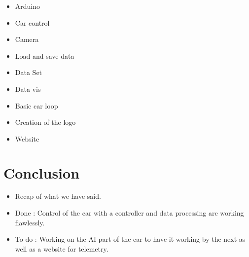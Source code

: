\documentclass[11pt]{article}
\begin{document}
\begin{itemize}

\item Arduino %
\item Car control %
\item Camera %
\item Load and save data %
\item Data Set %
\item Data vis %
\item Basic car loop %
\item Creation of the logo %
\item Website %

\end{itemize}

\section {Conclusion}

\begin{itemize}
\item Recap of what we have said.
\item Done : Control of the car with a controller and data processing are working flawlessly.

\item To do : Working on the AI part of the car to have it working by the next as well as a website for telemetry.
\end{itemize}
\end{document}
